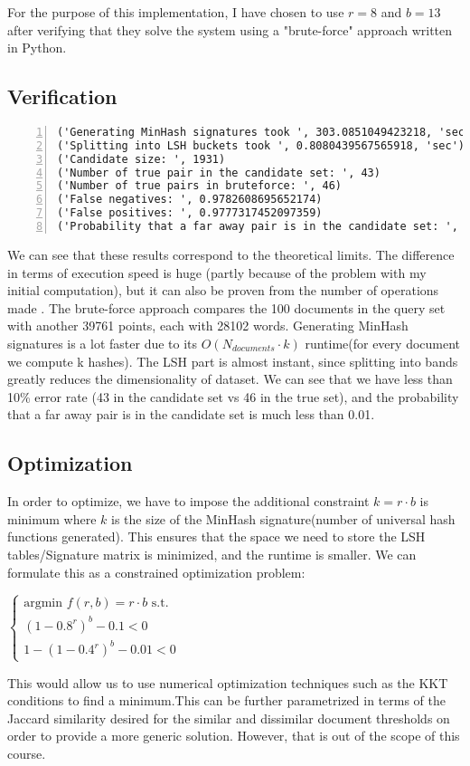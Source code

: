 For the purpose of this implementation, I have chosen to use $r=8$ and $b=13$ after verifying that they solve the system using a  "brute-force" approach written in Python.

\subsection{Verification}
\begin{lstlisting}[language={},numbers=left,numberstyle=\tiny,frame=single,breaklines=true,postbreak=\mbox{\textcolor{red}{$\hookrightarrow$}\space}]
('Generating MinHash signatures took ', 303.0851049423218, 'sec')
('Splitting into LSH buckets took ', 0.8080439567565918, 'sec')
('Candidate size: ', 1931)
('Number of true pair in the candidate set: ', 43)
('Number of true pairs in bruteforce: ', 46)
('False negatives: ', 0.9782608695652174)
('False positives: ', 0.9777317452097359)
('Probability that a far away pair is in the candidate set: ', 0.0008969085829825304)
\end{lstlisting}

We can see that these results correspond to the theoretical limits. The difference in terms of execution speed is huge (partly because of the problem with my initial computation), but it can also be proven from the number of operations made . 
The brute-force approach compares the 100 documents in the query set with another 39761 points, each with 28102 words. Generating MinHash signatures is a lot faster due to its $O(N_{documents}\cdot k)$ runtime(for every document we compute k hashes).
The LSH part is almost instant, since splitting into bands greatly reduces the dimensionality of dataset.
We can see that we have less than 10\% error rate (43 in the candidate set vs 46 in the true set), and the probability that a far away pair is in the candidate set is much less than 0.01.

\subsection{Optimization}
In order to optimize, we have to impose the additional constraint $k=r \cdot b$ is minimum where $k$ is the size of the MinHash signature(number of universal hash functions generated). This ensures that the space we need to store the LSH tables/Signature matrix is minimized, and the runtime is smaller. We can formulate this as a constrained optimization problem:

$\begin{cases}
\text{argmin } f(r,b) = r \cdot b \text{ s.t.}\\
(1-0.8^r)^b - 0.1< 0\\
1 - (1-0.4^r)^b - 0.01 < 0
\end{cases}$

This would allow us to use numerical optimization techniques such as the KKT conditions to find a minimum.This can be further parametrized in terms of the Jaccard similarity desired for the similar and dissimilar document thresholds on order to provide a more generic solution. However, that is out of the scope of this course.

